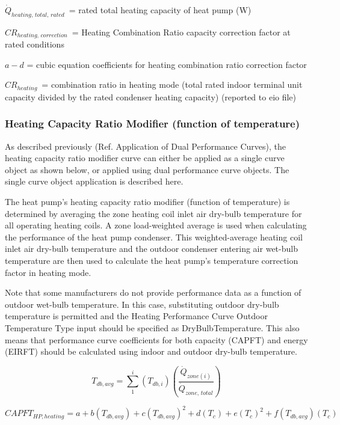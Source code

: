\(\dot{Q}_{heating,\,total,\,rated}\) = rated total heating capacity of heat pump (W)

\(CR_{heating,\,correction}\) = Heating Combination Ratio capacity correction factor at rated conditions

\(a - d\) = cubic equation coefficients for heating combination ratio correction factor

\(CR_{heating}\) = combination ratio in heating mode (total rated indoor terminal unit capacity divided by the rated condenser heating capacity) (reported to eio file)

\subsubsection{Heating Capacity Ratio Modifier (function of temperature)}\label{heating-capacity-ratio-modifier-function-of-temperature}

As described previously (Ref. Application of Dual Performance Curves), the heating capacity ratio modifier curve can either be applied as a single curve object as shown below, or applied using dual performance curve objects. The single curve object application is described here.

The heat pump's heating capacity ratio modifier (function of temperature) is determined by averaging the zone heating coil inlet air dry-bulb temperature for all operating heating coils. A zone load-weighted average is used when calculating the performance of the heat pump condenser. This weighted-average heating coil inlet air dry-bulb temperature and the outdoor condenser entering air wet-bulb temperature are then used to calculate the heat pump's temperature correction factor in heating mode.

Note that some manufacturers do not provide performance data as a function of outdoor wet-bulb temperature. In this case, substituting outdoor dry-bulb temperature is permitted and the Heating Performance Curve Outdoor Temperature Type input should be specified as DryBulbTemperature. This also means that performance curve coefficients for both capacity (CAPFT) and energy (EIRFT) should be calculated using indoor and outdoor dry-bulb temperature.

\begin{equation}
  T_{db,avg} = \sum\limits_1^i \left( T_{db,i} \right) \left( \frac{\dot{Q}_{zone(i)}}{\dot{Q}_{zone,\,total}} \right)
\end{equation}

\begin{equation}
  CAPFT_{HP,heating} = a + b \left( T_{db,avg} \right) + c \left( T_{db,avg} \right)^2 + d \left( T_c \right) + e \left( T_c \right)^2 + f \left( T_{db,avg} \right) \left( T_c \right)
\end{equation}

